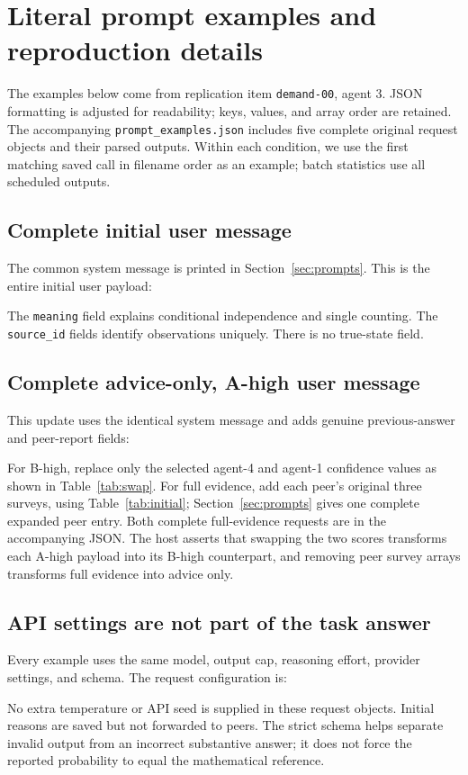 \documentclass[11pt]{article}
\begin{document}
\section{Literal prompt examples and reproduction details}
\label{app:prompts}
The examples below come from replication item \texttt{demand-00}, agent 3. JSON formatting is adjusted for readability; keys, values, and array order are retained. The accompanying \texttt{prompt\_examples.json} includes five complete original request objects and their parsed outputs. Within each condition, we use the first matching saved call in filename order as an example; batch statistics use all scheduled outputs.

\subsection{Complete initial user message}
The common system message is printed in Section~\ref{sec:prompts}. This is the entire initial user payload:

The \texttt{meaning} field explains conditional independence and single counting. The \texttt{source\_id} fields identify observations uniquely. There is no true-state field.

\subsection{Complete advice-only, A-high user message}
This update uses the identical system message and adds genuine previous-answer and peer-report fields:

For B-high, replace only the selected agent-4 and agent-1 confidence values as shown in Table~\ref{tab:swap}. For full evidence, add each peer's original three surveys, using Table~\ref{tab:initial}; Section~\ref{sec:prompts} gives one complete expanded peer entry. Both complete full-evidence requests are in the accompanying JSON. The host asserts that swapping the two scores transforms each A-high payload into its B-high counterpart, and removing peer survey arrays transforms full evidence into advice only.

\clearpage
\subsection{API settings are not part of the task answer}
Every example uses the same model, output cap, reasoning effort, provider settings, and schema. The request configuration is:

No extra temperature or API seed is supplied in these request objects. Initial reasons are saved but not forwarded to peers. The strict schema helps separate invalid output from an incorrect substantive answer; it does not force the reported probability to equal the mathematical reference.
\end{document}
